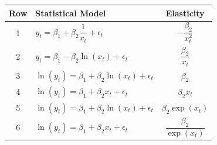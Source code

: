 \documentclass[journal,12pt,onecolumn]{IEEEtran}
\theoremstyle{remark}
\begin{document}
\begin{enumerate}
\begin{center}
\begin{tabular}{|c|l|c|}
\hline
Row & Statistical Model & Elasticity \\
\hline
1 & $y_t = \beta_1 + \beta_2 \dfrac{1}{x_t} + \epsilon_t$ & $-\dfrac{\beta_2}{x_t^2}$ \\
2 & $y_t = \beta_1 - \beta_2 \ln(x_t) + \epsilon_t$ & $\dfrac{\beta_2}{x_t}$ \\
3 & $\ln(y_t) = \beta_1 + \beta_2 \ln(x_t) + \epsilon_t $ & $\beta_2$ \\
4 & $\ln(y_t) = \beta_1 + \beta_2 x_t + \epsilon_t$ & $\beta_2 x_t$ \\
5 & $\ln(y_t) = \beta_1 + \beta_2 \ln(x_t) + \epsilon_t $ & $\beta_2 \exp(x_t)$ \\
6 & $\ln(y_t) = \beta_1 + \beta_2 x_t + \epsilon_t$ & $\dfrac{\beta_2}{\exp(x_t)}$ \\
\hline
\end{tabular}
\end{center}


\end{enumerate}
\end{document}
